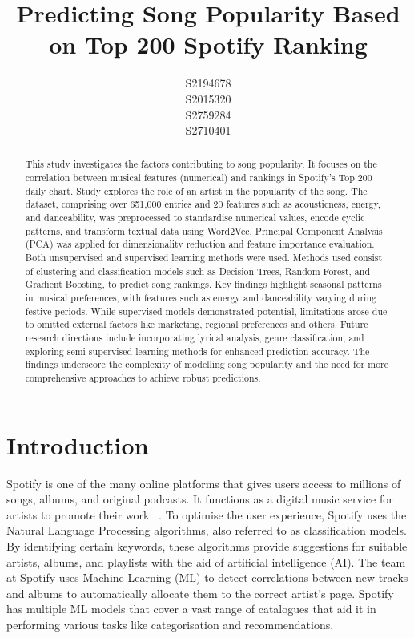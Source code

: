 \documentclass{article}
\title{Predicting Song Popularity Based on Top 200 Spotify Ranking}
\author{
  S2194678\\
  \And
  S2015320\\
 \And
  S2759284\\
  \And
  S2710401\\
}
\begin{document}
\maketitle

\begin{abstract}

This study investigates the factors contributing to song popularity. It focuses on the correlation between musical features (numerical) and rankings in Spotify's Top 200 daily chart. Study explores the role of an artist in the popularity of the song. The dataset, comprising over 651,000 entries and 20 features such as acousticness, energy, and danceability, was preprocessed to standardise numerical values, encode cyclic patterns, and transform textual data using Word2Vec. Principal Component Analysis (PCA) was applied for dimensionality reduction and feature importance evaluation. Both unsupervised and supervised learning methods were used. Methods used consist of clustering and classification models such as Decision Trees, Random Forest, and Gradient Boosting, to predict song rankings. Key findings highlight seasonal patterns in musical preferences, with features such as energy and danceability varying during festive periods. While supervised models demonstrated potential, limitations arose due to omitted external factors like marketing, regional preferences and others. Future research directions include incorporating lyrical analysis, genre classification, and exploring semi-supervised learning methods for enhanced prediction accuracy. The findings underscore the complexity of modelling song popularity and the need for more comprehensive approaches to achieve robust predictions.

\end{abstract}

\section{Introduction}

Spotify is one of the many online platforms that gives users access to millions of songs, albums, and original podcasts. It functions as a digital music service for artists to promote their work \cite{Pedroche2020} . To optimise the user experience, Spotify uses the Natural Language Processing algorithms, also referred to as classification models. By identifying certain keywords, these algorithms provide suggestions for suitable artists, albums, and playlists with the aid of artificial intelligence (AI). \cite{Bjorklund2022} The team at Spotify uses Machine Learning (ML) to detect correlations between new tracks and albums to automatically allocate them to the correct artist’s page. Spotify has multiple ML models that cover a vast range of catalogues that aid it in performing various tasks like categorisation and recommendations. \cite{SpotifyAnnotations2024} 
\end{document}
